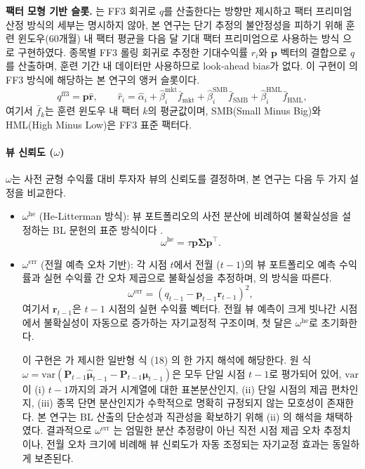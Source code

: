 \documentclass{article}
\begin{document}
\textbf{팩터 모형 기반 슬롯.} \citet{pyo2018}는 FF3 회귀로 $q$를 산출한다는 방향만 제시하고 팩터 프리미엄 산정 방식의 세부는 명시하지 않아, 본 연구는 단기 추정의 불안정성을 피하기 위해 훈련 윈도우(60개월) 내 팩터 평균을 다음 달 기대 팩터 프리미엄으로 사용하는 방식 \citep{fama1973risk, cochrane2005} 으로 구현하였다. 종목별 FF3 롤링 회귀로 추정한 기대수익률 $\hat{r}_i$와 $\mathbf{p}$ 벡터의 결합으로 $q$를 산출하며, 훈련 기간 내 데이터만 사용하므로 look-ahead bias가 없다. 이 구현이 \citet{pyo2018}의 FF3 방식에 해당하는 본 연구의 앵커 슬롯이다.
\begin{equation}
  q^{\mathrm{ff3}} = \mathbf{p}\hat{\mathbf{r}}, \qquad
  \hat{r}_i = \hat{\alpha}_i + \hat{\beta}_i^{\mathrm{mkt}}\bar{f}_{\mathrm{mkt}} + \hat{\beta}_i^{\mathrm{SMB}}\bar{f}_{\mathrm{SMB}} + \hat{\beta}_i^{\mathrm{HML}}\bar{f}_{\mathrm{HML}},
\end{equation}
여기서 $\bar{f}_k$는 훈련 윈도우 내 팩터 $k$의 평균값이며, SMB(Small Minus Big)와 HML(High Minus Low)은 FF3 표준 팩터다.

\paragraph{뷰 신뢰도 ($\omega$)}

$\omega$는 사전 균형 수익률 대비 투자자 뷰의 신뢰도를 결정하며, 본 연구는 다음 두 가지 설정을 비교한다.

\begin{itemize}
  \item $\omega^{\mathrm{he}}$ (He-Litterman 방식): 뷰 포트폴리오의 사전 분산에 비례하여 불확실성을 설정하는 BL 문헌의 표준 방식이다 \citep{helitterman1999}.
    \begin{equation}
      \omega^{\mathrm{he}} = \tau\mathbf{p}\boldsymbol{\Sigma}\mathbf{p}^\top.
    \end{equation}

  \item $\omega^{\mathrm{err}}$ (전월 예측 오차 기반): 각 시점 $t$에서 전월 ($t-1$)의 뷰 포트폴리오 예측 수익률과 실현 수익률 간 오차 제곱으로 불확실성을 추정하며, \citet{pyo2018}의 방식을 따른다.
    \begin{equation}
      \omega^{\mathrm{err}} = \left(q_{t-1} - \mathbf{p}_{t-1}\mathbf{r}_{t-1}\right)^2,
    \end{equation}
    여기서 $\mathbf{r}_{t-1}$은 $t-1$ 시점의 실현 수익률 벡터다. 전월 뷰 예측이 크게 빗나간 시점에서 불확실성이 자동으로 증가하는 자기교정적 구조이며, 첫 달은 $\omega^{\mathrm{he}}$로 초기화한다.

    이 구현은 \citet{pyo2018} 가 제시한 일반형 식 (18) 의 한 가지 해석에 해당한다. 원 식 $\omega = \mathrm{var}(\mathbf{P}_{t-1}\hat{\boldsymbol{\mu}}_{t-1} - \mathbf{P}_{t-1}\boldsymbol{\mu}_{t-1})$은 모두 단일 시점 $t-1$로 평가되어 있어, $\mathrm{var}$이 (i) $t-1$까지의 과거 시계열에 대한 표본분산인지, (ii) 단일 시점의 제곱 편차인지, (iii) 종목 단면 분산인지가 수학적으로 명확히 규정되지 않는 모호성이 존재한다. 본 연구는 BL 산출의 단순성과 직관성을 확보하기 위해 (ii) 의 해석을 채택하였다. 결과적으로 $\omega^{\mathrm{err}}$ 는 엄밀한 분산 추정량이 아닌 직전 시점 제곱 오차 추정치이나, 전월 오차 크기에 비례해 뷰 신뢰도가 자동 조정되는 자기교정 효과는 동일하게 보존된다.
\end{itemize}
\end{document}

